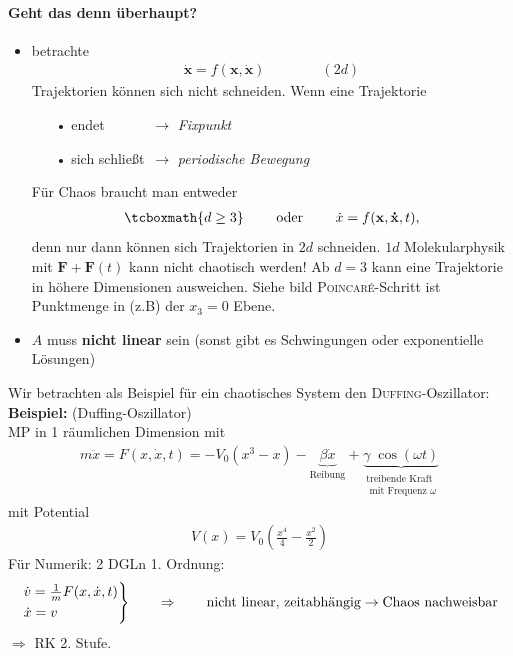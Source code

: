 \documentclass[12pt]{article}
\begin{document}
\paragraph{Geht das denn überhaupt?}
\begin{itemize}
\item betrachte  
\begin{align*}
\dot{\mathbf{x}} = f(\mathbf{x}, \mathbf{\dot{x}}) \qquad \qquad (2d)
\end{align*}
Trajektorien können sich nicht schneiden. Wenn eine Trajektorie
\begin{itemize}
\item[•] endet $\qquad \quad \to$ \textit{Fixpunkt}
\item[•] sich schließt $\, \to$ \textit{periodische Bewegung}
\end{itemize} 
Für Chaos braucht man entweder 
\begin{align*}
\tcboxmath{ d \geq 3} \qquad \text{ oder } \qquad
\dot{x} = f(\mathbf{x}, \mathbf{\dot{x}},t),
\end{align*}
denn nur dann können sich Trajektorien in $2d$ schneiden.
$1d$ Molekularphysik mit $\mathbf{F} + \mathbf{F}(t)$ kann nicht chaotisch werden! Ab $d=3$ kann eine Trajektorie in höhere Dimensionen ausweichen. Siehe bild %
\textsc{Poincaré}-Schritt ist Punktmenge in (z.B) der $x_3 =0$ Ebene.

\item $A$ muss \textbf{nicht linear} sein (sonst gibt es Schwingungen oder exponentielle Lösungen)
\end{itemize}
Wir betrachten als Beispiel für ein chaotisches System den \textsc{Duffing}-Oszillator:
\textbf{Beispiel:} (Duffing-Oszillator) \\
MP in 1 räumlichen Dimension mit 
\begin{align*}
m \ddot{x} = F(x, \dot{x},t) = - V_0 (x^3 - x ) -\underbrace{ \beta \dot{x}}_\text{Reibung} + \underbrace{\gamma \; \cos (\omega t)}_{\substack{ \text{treibende Kraft} \\ \text{ mit Frequenz $\omega$}}}  
\end{align*}
mit Potential
\begin{align*}
V(x) = V_0 ( \frac{x^4}{4} - \frac{x^2}{2})
\end{align*}
Für Numerik: 2 DGLn 1. Ordnung:
\begin{align*}
\begin{rcases}
\dot{v}= \frac{1}{m} F(x, \dot{x}, t) \\
\dot{x}= v
\end{rcases} \qquad \Rightarrow \qquad \text{nicht linear, zeitabhängig} \to \text{Chaos nachweisbar}
\end{align*}
$\Rightarrow$ RK 2. Stufe. \\
\end{document}
